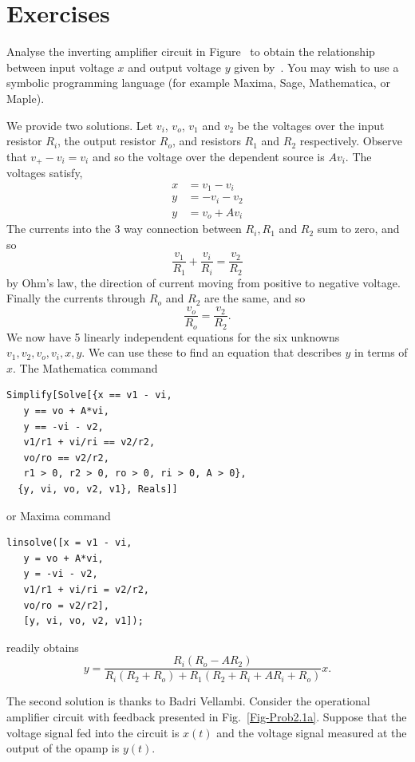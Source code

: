 
\section*{Exercises}

\begin{excersizelist}

\item \label{exer:multiplieropampwithmodel}  Analyse the inverting amplifier circuit in Figure~ to obtain the relationship between input voltage $x$ and output voltage $y$ given by~.  You may wish to use a symbolic programming language (for example Maxima, Sage, Mathematica, or Maple).
\begin{solution}
We provide two solutions.  Let $v_i$, $v_o$, $v_1$ and $v_2$ be the voltages over the input resistor $R_i$, the output resistor $R_o$, and resistors $R_1$ and $R_2$ respectively.  Observe that $v_+ - v_i = v_i$ and so the voltage over the dependent source is $A v_i$.  The voltages satisfy,
\begin{align*}
x &= v_1 - v_i \\
y &= -v_i - v_2 \\
y &=  v_o + Av_i
\end{align*}
The currents into the 3 way connection between $R_i, R_1$ and $R_2$ sum to zero, and so
\[
\frac{v_1}{R_1} + \frac{v_i}{R_i} = \frac{v_2}{R_2}
\]
by Ohm's law, the direction of current moving from positive to negative voltage.  Finally the currents through $R_o$ and $R_2$ are the same, and so
\[
\frac{v_o}{R_o} = \frac{v_2}{R_2}.
\]
We now have 5 linearly independent equations for the six unknowns $v_1, v_2, v_o, v_i, x, y$.  We can use these to find an equation that describes $y$ in terms of $x$.  The Mathematica command
\begin{verbatim}
Simplify[Solve[{x == v1 - vi,
   y == vo + A*vi,
   y == -vi - v2,
   v1/r1 + vi/ri == v2/r2,
   vo/ro == v2/r2,
   r1 > 0, r2 > 0, ro > 0, ri > 0, A > 0},
  {y, vi, vo, v2, v1}, Reals]]
\end{verbatim}
or Maxima command
\begin{verbatim}
linsolve([x = v1 - vi,
   y = vo + A*vi,
   y = -vi - v2,
   v1/r1 + vi/ri = v2/r2,
   vo/ro = v2/r2],
   [y, vi, vo, v2, v1]);
\end{verbatim}
readily obtains
\[
y = \frac{R_i (R_o - A R_2) }{R_i (R_2+R_o)+R_1 (R_2+R_i + A R_i+R_o)}x.
\]

The second solution is thanks to Badri Vellambi.  Consider the operational amplifier circuit with feedback presented in Fig.~\ref{Fig-Prob2.1a}. Suppose that the voltage signal fed into the circuit is $x(t)$ and the voltage signal measured at the output of the opamp is $y(t)$. 


\end{solution}
\end{excersizelist}
